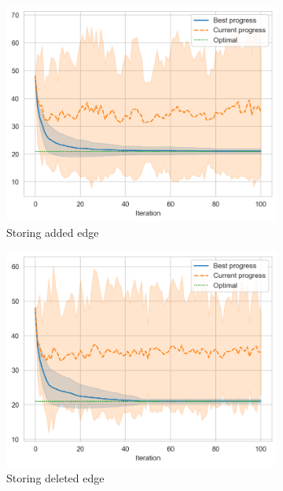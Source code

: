 \begin{figure}[ht]
    \centering
    \begin{subfigure}{0.45\textwidth}
        \centering
        \includegraphics[width=\textwidth]{../images/p1/added34s.png}
        \caption{Storing added edge}
    \end{subfigure}
    \begin{subfigure}{0.45\textwidth}
        \centering
        \includegraphics[width=\textwidth]{../images/p1/deleted34s.png}
        \caption{Storing deleted edge}
    \end{subfigure}
    \begin{subfigure}{0.45\textwidth}

\end{subfigure}
\end{figure}
